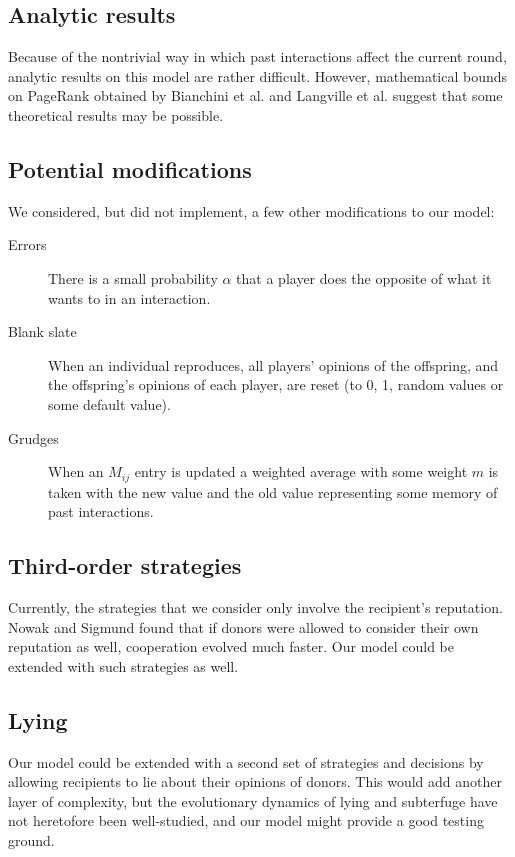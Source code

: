 \documentclass{amsart}
\begin{document}
\subsection{Analytic results}

Because of the nontrivial way in which past interactions affect the
current round, analytic results on this model are rather
difficult. However, mathematical bounds on PageRank obtained by
Bianchini et al. \cite{bianchini_Inside_2005} and Langville et
al. \cite{langville_deeper_2004} suggest that some theoretical results
may be possible.

\subsection{Potential modifications}

We considered, but did not implement, a few other modifications to our
model:
\begin{description}
\item[Errors] There is a small probability $\alpha$ that a player does
  the opposite of what it wants to in an interaction.
\item[Blank slate] When an individual reproduces, all players'
  opinions of the offspring, and the offspring's opinions of each
  player, are reset (to 0, 1, random values or some default value).
\item[Grudges] When an $M_{ij}$ entry is updated a weighted average
  with some weight $m$ is taken with the new value and the old value
  representing some memory of past interactions.
\end{description}

\subsection{Third-order strategies}

Currently, the strategies that we consider only involve the
recipient's reputation. Nowak and Sigmund \cite{nowak_evolution_1998}
found that if donors were allowed to consider their own reputation as
well, cooperation evolved much faster. Our model could be extended
with such strategies as well.

\subsection{Lying}

Our model could be extended with a second set of strategies and
decisions by allowing recipients to lie about their opinions of
donors. This would add another layer of complexity, but the
evolutionary dynamics of lying and subterfuge have not heretofore been
well-studied, and our model might provide a good testing ground.
\end{document}
